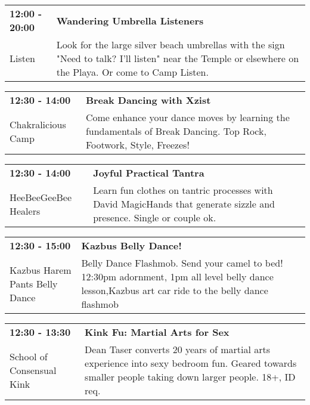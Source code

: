 \begin{tabular}{ p{1in} p{2.2in} }
    \textbf{12:00 - 20:00} & \textbf{Wandering Umbrella Listeners} \\
    Listen \newline  & Look for the large silver beach umbrellas with the sign "Need to talk? I'll listen" near the Temple or elsewhere on the Playa. Or come to Camp Listen. \\
    \hline 
\end{tabular}
    
\begin{tabular}{ p{1in} p{2.2in} }
    \textbf{12:30 - 14:00} & \textbf{Break Dancing with Xzist} \\
    Chakralicious Camp \newline  & Come enhance your dance moves by learning the fundamentals of Break Dancing. Top Rock, Footwork, Style, Freezes! \\
    \hline 
\end{tabular}
    
\begin{tabular}{ p{1in} p{2.2in} }
    \textbf{12:30 - 14:00} & \textbf{Joyful Practical Tantra} \\
    HeeBeeGeeBee Healers \newline  & Learn fun clothes on tantric processes with David MagicHands that generate sizzle and presence. Single or couple ok. \\
    \hline 
\end{tabular}
    
\begin{tabular}{ p{1in} p{2.2in} }
    \textbf{12:30 - 15:00} & \textbf{Kazbus Belly Dance!} \\
    Kazbus Harem Pants Belly Dance \newline  & Belly Dance Flashmob. Send your camel to bed! 12:30pm adornment, 1pm all level belly dance lesson,Kazbus art car ride to the belly dance flashmob \\
    \hline 
\end{tabular}
    
\begin{tabular}{ p{1in} p{2.2in} }
    \textbf{12:30 - 13:30} & \textbf{Kink Fu: Martial Arts for Sex } \\
    School of Consensual Kink \newline  & Dean Taser converts 20 years of martial arts experience into sexy bedroom fun. Geared towards smaller people taking down larger people. 18+, ID req. \\
    \hline 
\end{tabular}
    

